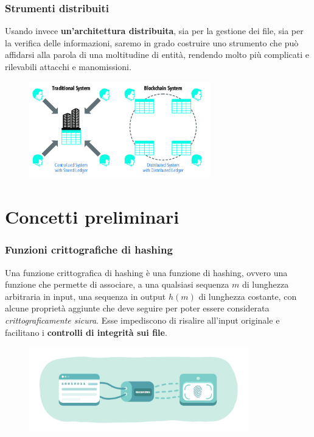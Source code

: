 \documentclass{beamer}
\begin{document}
\begin{frame}
	\frametitle{Strumenti distribuiti}
		Usando invece \textbf{un'architettura distribuita}, sia per la gestione dei file,
		sia per la verifica delle informazioni, saremo in grado costruire uno strumento
		che può affidarsi alla parola di una moltitudine di entità, rendendo molto
		più complicati e rilevabili attacchi e manomissioni.
	\medskip
	\begin{figure}
		\includegraphics[width=0.70\textwidth]{dece.jpg}
	\end{figure}
\end{frame}

\section{Concetti preliminari}
\begin{frame}
	\frametitle{Funzioni crittografiche di hashing}
	Una funzione crittografica di hashing è una funzione di hashing, ovvero
	una funzione che permette di associare,
	a una qualsiasi sequenza \(m\) di lunghezza arbitraria in input, una sequenza
	in output \(h(m)\) di lunghezza costante,
	con alcune proprietà aggiunte che deve seguire per poter essere considerata
	\emph{crittograficamente sicura}. Esse impediscono di risalire all'input originale
	e facilitano i \textbf{controlli di integrità sui file}.
	\begin{figure}
		\includegraphics[width=0.85\textwidth]{figures/hashing.jpg}
	\end{figure}
\end{frame}
\end{document}
